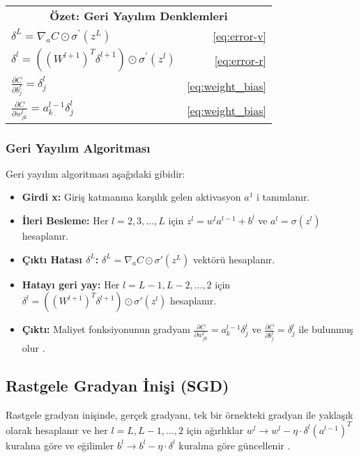 \begin{table}[H]
\centering
\renewcommand{\arraystretch}{2}
\begin{tabular}{|lr|}
\hline
\multicolumn{2}{|c|}{\textbf{Özet: Geri Yayılım Denklemleri}} \\
$\delta^L = \nabla_a C \odot \sigma^{\prime}\left(z^L\right)$ & \eqref{eq:error-v}\\
$\delta^l = \left( \left(W^{l+1}\right)^T \delta^{l+1} \right) \odot \sigma^{\prime}\left(z^l\right)$ & \eqref{eq:error-r} \\
$\frac{\partial C}{\partial b_j^l} = \delta_j^l$ & \eqref{eq:weight_bias} \\
$\frac{\partial C}{\partial w_{jk}^l} = a_k^{l-1} \delta_j^l$ & \eqref{eq:weight_bias} \\
\hline
\end{tabular}
\end{table}

\subsubsection{Geri Yayılım Algoritması}

Geri yayılım algoritması aşağıdaki gibidir:

\begin{itemize}
    \item \textbf{Girdi x:} Giriş katmanına karşılık gelen aktivasyon $a^1$ i tanımlanır.
    \item \textbf{İleri Besleme:} Her $l = 2, 3, \ldots, L$ için $z^l=w^la^{l-1}+b^l$ ve $a^l=\sigma(z^l)$ hesaplanır.
    \item \textbf{Çıktı Hatası $\delta^L$:} $\delta^{L} = \nabla_a C \odot \sigma'(z^L)$ vektörü hesaplanır.
    \item \textbf{Hatayı geri yay:} Her $l=L-1,L-2,\ldots,2$ için $\delta^l=((W^{l+1})^T \delta^{l+1}) \odot \sigma'(z^{l})$ hesaplanır.
    \item \textbf{Çıktı:} Maliyet fonksiyonunun gradyanı $\frac{\partial C}{\partial w^l_{jk}} = a^{l-1}_k \delta^l_j$ ve $\frac{\partial C}{\partial b^l_j} = \delta^l_j$ ile bulunmuş olur \cite{nielsen2015neural}.
\end{itemize}

\subsection{Rastgele Gradyan İnişi (SGD)}

Rastgele gradyan inişinde, gerçek gradyanı, tek bir örnekteki gradyan ile yaklaşık olarak hesaplanır ve her $l = L, L-1, \ldots, 2$ için ağırlıklar $w^l \rightarrow w^l-\eta \cdot \delta^l (a^{l-1})^T$ kuralına göre ve eğilimler $b^l \rightarrow b^l-\eta \cdot \delta^l$ kuralına göre güncellenir \cite{StochasticLeon}.


